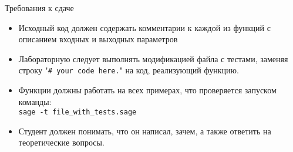 \documentclass[12pt]{article}
\theoremstyle{definition}
\theoremstyle{definition}
\theoremstyle{definition}
\begin{document}
    Требования к сдаче
    \begin{itemize}
        \item Исходный код должен содержать комментарии к каждой из функций с описанием входных и выходных параметров
        \item Лабораторную следует выполнять модификацией файла с тестами, заменяя строку "\texttt{\# your code here.}" на код, реализующий функцию.
        \item Функции должны работать на всех примерах, что проверяется запуском команды:
        \\\texttt{sage -t file\_with\_tests.sage}
        \item Студент должен понимать, что он написал, зачем, а также ответить на теоретические вопросы.
    \end{itemize}
    
\end{document}
